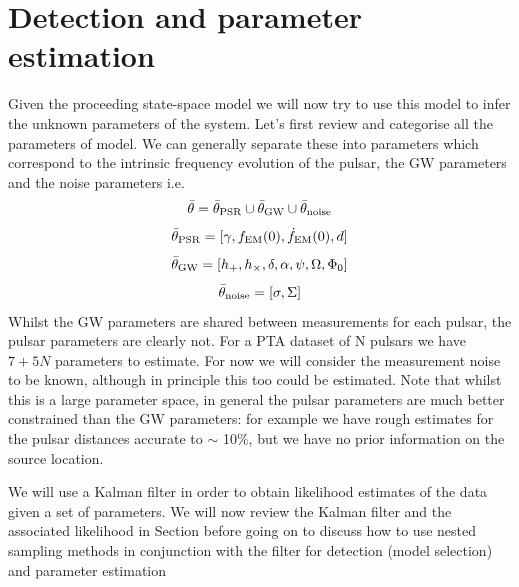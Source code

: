 \documentclass[fleqn,usenatbib,useAMS]{mnras}
\begin{document}
\section{Detection and parameter estimation}
Given the proceeding state-space model we will now try to use this model to infer the unknown parameters of the system. Let's first review and categorise all the parameters of model. We can generally separate these into parameters which correspond to the intrinsic frequency evolution of the pulsar, the GW parameters and the noise parameters i.e.
\begin{equation}
	\bar{\theta} =  \bar{\theta}_{\rm PSR} \cup \bar{\theta}_{\rm GW} \cup \bar{\theta}_{\rm noise}
\end{equation}
\begin{equation}
	\bar{\theta}_{\rm PSR} = [\gamma, f_{\rm EM}(0), \dot{f}_{\rm EM}(0),d]
\end{equation}
\begin{equation}
	\bar{\theta}_{\rm GW} = [h_{+}, h_{\times}, \delta, \alpha, \psi, \Omega, \Phi_0]
\end{equation}
\begin{equation}
	\bar{\theta}_{\rm noise} = [\sigma, \Sigma]
\end{equation}
Whilst the GW parameters are shared between measurements for each pulsar, the pulsar parameters are clearly not. For a PTA dataset of N pulsars we have $7 + 5N$ parameters to estimate. For now we will consider the measurement noise to be known, although in principle this too could be estimated. Note that whilst this is a large parameter space, in general the pulsar parameters are much better constrained than the GW parameters: for example we have rough estimates for the pulsar distances accurate to $\sim$ 10$\%$, but we have no prior information on the source location. \newline 

\noindent We will use a Kalman filter in order to obtain likelihood estimates of the data given a set of parameters. We will now review the Kalman filter and the associated likelihood in Section \label{sec:kalman_filter} before going on to discuss how to use nested sampling methods in conjunction with the filter for detection (model selection) and parameter estimation
\end{document}
